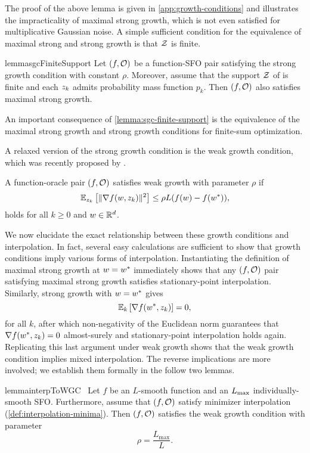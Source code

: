 The proof of the above lemma is given in \autoref{app:growth-conditions} and illustrates the impracticality of maximal strong growth, which is not even satisfied for multiplicative Gaussian noise.
A simple sufficient condition for the equivalence of maximal strong and strong growth is that \( \calZ \) is finite.
\begin{restatable}{lemma}{sgcFiniteSupport}\label{lemma:sgc-finite-support}
    Let \( \rbr{f, \oracle{}} \) be a function-\ac{SFO} pair satisfying the strong growth condition with constant \( \rho \).
    Moreover, assume that the support \( \calZ \) of \oracle{} is finite and each \( \zk \) admits probability mass function \( p_k \). 
    Then \( \rbr{f, \oracle{}} \) also satisfies maximal strong growth.
\end{restatable}
An important consequence of \autoref{lemma:sgc-finite-support} is the equivalence of the maximal strong growth and strong growth conditions for finite-sum optimization.

A relaxed version of the strong growth condition is the weak growth condition, which was recently proposed by \citet{vaswani2019fast}.
\begin{definition}\label{def:wgc}
    A function-oracle pair \( \rbr{f, \oracle{}} \) satisfies weak growth with parameter \(\rho \) if
    \[ \Ek \sbr{\norm{\grad(\w, \zk)}^2} \leq \rho L (f(\w) - f(\wopt)), \]
    holds for all \( k \geq 0 \) and \( \w \in \R^d\).
\end{definition}

We now elucidate the exact relationship between these growth conditions and interpolation.
In fact, several easy calculations are sufficient to show that growth conditions imply various forms of interpolation.
Instantiating the definition of maximal strong growth at \( \w = \wopt \) immediately shows that any \( \rbr{f, \oracle{}} \) pair satisfying maximal strong growth satisfies stationary-point interpolation.
Similarly, strong growth with \( \w = \wopt \) gives  
\[ \E_k\sbr{\grad(\wopt, \zk)} = 0, \] 
for all \( k \), after which non-negativity of the Euclidean norm guarantees that \( \grad(\wopt, \zk) = 0 \) almost-surely and stationary-point interpolation holds again.
Replicating this last argument under weak growth shows that the weak growth condition implies mixed interpolation.
The reverse implications are more involved; we establish them formally in the follow two lemmas. 
\begin{restatable}{lemma}{interpToWGC}~\label{lemma:interpolation-to-wgc}
    Let \( f \) be an \( L \)-smooth function and \oracle{} an \( \Lmax \) individually-smooth \ac{SFO}.
    Furthermore, assume that \( \rbr{f, \oracle{}} \) satisfy minimizer interpolation (\autoref{def:interpolation-minima}).
    Then \( \rbr{f, \oracle{}} \) satisfies the weak growth condition with parameter
    \[ \rho = \frac{L_{\text{max}}}{L}. \]
\end{restatable}

